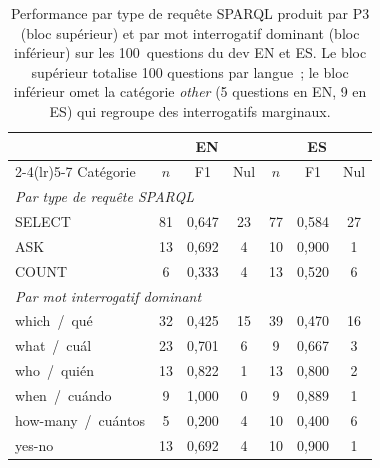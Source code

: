 \documentclass[]{ceurart}
\begin{document}
\begin{table}[h]
\centering
\caption{Performance par type de requête SPARQL produit par P3 (bloc supérieur) et par mot interrogatif dominant (bloc inférieur) sur les 100~questions du dev EN et ES. Le bloc supérieur totalise 100 questions par langue~; le bloc inférieur omet la catégorie \emph{other} (5 questions en EN, 9 en ES) qui regroupe des interrogatifs marginaux.}
\label{tab:bytypeinterr}
\begin{tabular}{lcccccc}
\toprule
 & \multicolumn{3}{c}{EN} & \multicolumn{3}{c}{ES} \\
\cmidrule(lr){2-4}\cmidrule(lr){5-7}
Catégorie & $n$ & F1 & Nul & $n$ & F1 & Nul \\
\midrule
\multicolumn{7}{l}{\emph{Par type de requête SPARQL}} \\
SELECT   & 81 & 0{,}647 & 23 & 77 & 0{,}584 & 27 \\
ASK      & 13 & 0{,}692 &  4 & 10 & 0{,}900 &  1 \\
COUNT    &  6 & 0{,}333 &  4 & 13 & 0{,}520 &  6 \\
\midrule
\multicolumn{7}{l}{\emph{Par mot interrogatif dominant}} \\
which~/~qué        & 32 & 0{,}425 & 15 & 39 & 0{,}470 & 16 \\
what~/~cuál        & 23 & 0{,}701 &  6 &  9 & 0{,}667 &  3 \\
who~/~quién        & 13 & 0{,}822 &  1 & 13 & 0{,}800 &  2 \\
when~/~cuándo      &  9 & 1{,}000 &  0 &  9 & 0{,}889 &  1 \\
how-many~/~cuántos &  5 & 0{,}200 &  4 & 10 & 0{,}400 &  6 \\
yes-no             & 13 & 0{,}692 &  4 & 10 & 0{,}900 &  1 \\
\bottomrule
\end{tabular}
\end{table}

\end{document}

